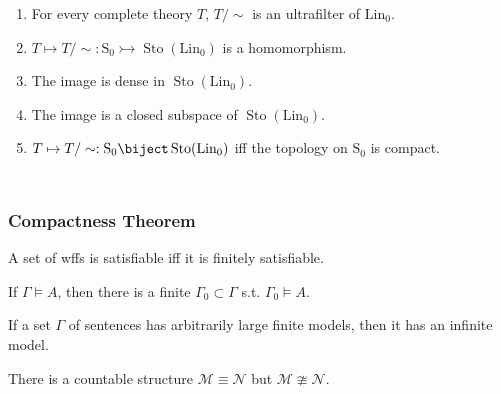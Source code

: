 \documentclass[UTF8,11pt,colorlinks,compress,openany]{beamer}%
\begin{document}
\begin{frame}
\begin{columns}[onlytextwidth]
{\begin{minipage}{.91\textwidth}
\begin{enumerate}
	\item For every complete theory $T$, $T/\sim$ is an ultrafilter of $\mathrm{Lin_0}$.
	\item $T\mapsto T/\sim:\mathrm{S_0}\rightarrowtail\operatorname{Sto}(\mathrm{Lin_0})$ is a homomorphism.
	\item The image is dense in $\operatorname{Sto}(\mathrm{Lin_0})$.
	\item The image is a closed subspace of $\operatorname{Sto}(\mathrm{Lin_0})$.
	\item $T\mapsto T/\sim:\mathrm{S_0}\biject\operatorname{Sto}(\mathrm{Lin_0})$ iff the topology on $\mathrm{S_0}$ is compact.
\end{enumerate}
\end{minipage}}
\end{columns}
\end{frame}

\begin{frame}\frametitle{Compactness Theorem}
	\begin{theorem}
		A set of wffs is satisfiable iff it is finitely satisfiable.
	\end{theorem}
	\begin{corollary}
		If $\Gamma\vDash A$, then there is a finite $\Gamma_0\subset\Gamma$ s.t. $\Gamma_0\vDash A$.
	\end{corollary}
	\begin{corollary}
		If a set $\Gamma$ of sentences has arbitrarily large finite models, then it has an infinite model.
	\end{corollary}
	\begin{corollary}
		There is a countable structure $\mathcal{M}\equiv\mathcal{N}$ but $\mathcal{M}\ncong\mathcal{N}$.
	\end{corollary}
\end{frame}
\end{document}
